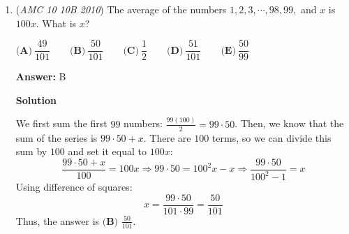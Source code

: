 \begin{enumerate}
 \textit{Case 2 }:  $x>30$

 When $x>30$, $60-2x<0$. When $x<0$ we can express this in the form $-x$.  Therefore we have $-(60-2x)=2x-60$.  This makes sure that this is positive, since we just took the negative of a negative to get a positive.  Therefore we have $x=|2x-(2x-60)|$
$x=|2x-2x+60|$
$x=|60|$
$x=60$

 We have now evaluated all the cases, and found the solution to be $\{60,12,20\}$ which have a sum of $\boxed{\textbf{(C)}\ 92}$




\textbf{Solution 2}

From the equation $x = \left|2x-|60-2x|\right|$ , we have $x = 2x-|60-2x|$ , or $-x = 2x-|60-2x|$. Therefore, $x=|60-2x|$ , or $3x=|60-2x|$. From here we have four possible cases:

 1. $x=60-2x$; this simplifies to $3x=60$, so $x=20$.

 2. $-x=60-2x$; this simplifies to $x=60$.

 3. $3x=60-2x$; this simplifies to $5x=60$, so $x=12$.

 4. $-3x=60-2x$; this simplifies to $-x=60$, so $x=-60$. However, this solution is extraneous because the absolute value of $2x-|60-2x|$ cannot be negative.

 The sum of all of the solutions of $x$ is $20+60+12=\boxed{\textbf{(C)}\ 92}$



	\item (\textit{AMC 10 10B 2010}) The average of the numbers $1, 2, 3,\cdots, 98, 99,$ and $x$ is $100x$. What is $x$?


 $\textbf{(A)}\ \dfrac{49}{101} \qquad \textbf{(B)}\ \dfrac{50}{101} \qquad \textbf{(C)}\ \dfrac{1}{2} \qquad \textbf{(D)}\ \dfrac{51}{101} \qquad \textbf{(E)}\ \dfrac{50}{99}$

 \textbf{Answer: }B



\textbf{Solution}

We first sum the first $99$ numbers: $\frac{99(100)}{2}=99\cdot50$. Then, we know that the sum of the series is $99\cdot50+x$. There are $100$ terms, so we can divide this sum by $100$ and set it equal to $100x$:
 \[\frac{99\cdot50+x}{100}=100x \Rightarrow 99\cdot50=100^2x-x\Rightarrow \frac{99\cdot50}{100^2-1}=x\]Using difference of squares:
 \[x=\frac{99\cdot50}{101\cdot99}=\frac{50}{101}\]Thus, the answer is $\boxed{\textbf{(B) }\frac{50}{101}}$.

 



\end{enumerate}
